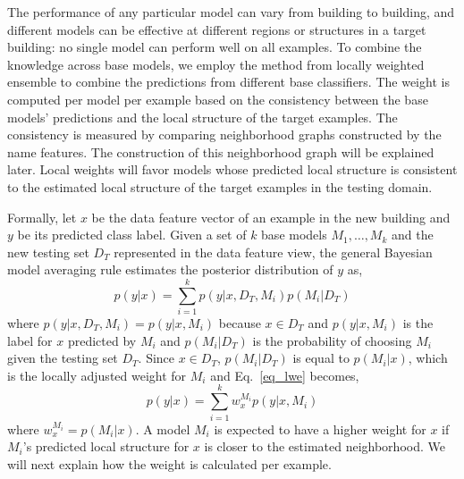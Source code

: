 The performance of any particular model can vary from building to building, and different models can be effective at different regions or structures in a target building: no single model can perform well on all examples.
To combine the knowledge across base models,
we employ the method from locally weighted ensemble \cite{lwe} to combine the predictions from different base classifiers.
The weight is computed per model per example based on the consistency between the base models' predictions and the local structure of the target examples.
The consistency is measured by comparing neighborhood graphs constructed by the name features. The construction of this neighborhood graph will be explained later.
Local weights will favor models whose predicted local structure is consistent to the estimated local structure of the target examples in the testing domain. 

Formally, let $x$ be the data feature vector of an example in the new building and $y$ be its predicted class label. Given a set of $k$ base models $M_1, \dots, M_k$ and the new testing set $D_T$ represented in the data feature view, the general Bayesian model averaging rule estimates the posterior distribution of $y$ as,
\begin{equation}\label{eq_lwe}
p(y|x)=\sum_{i=1}^k p(y|x,D_T,M_i) p(M_i|D_T)
\end{equation}
where $p(y|x,D_T,M_i) = p(y|x,M_i)$ because $x \in D_T$ and $p(y|x,M_i)$ is the label for $x$ predicted by $M_i$ and $p(M_i|D_T)$ is the probability of choosing $M_i$ given the testing set $D_T$.
Since $x \in D_T$, $p(M_i|D_T)$ is equal to $p(M_i|x)$, which is the locally adjusted weight for $M_i$ and Eq.~\ref{eq_lwe} becomes,
\begin{equation}\label{eq_sum}
p(y|x)=\sum_{i=1}^k w_{x}^{M_i} p(y|x, M_i)
\end{equation}
where $w_{x}^{M_i} = p(M_i|x)$.  A model $M_i$ is expected to have a higher weight for $x$ if $M_i$'s predicted local structure for $x$ is closer to the estimated neighborhood.
We will next explain how the weight is calculated per example.

